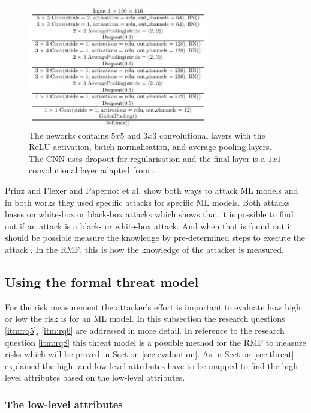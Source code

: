 \begin{figure}[ht!]
  \centering
  \includegraphics[width=8cm]{pictures/cnn_whitebox.jpg}
  \caption{The neworks contains $5x5$ and $3x3$ convolutional layers with the ReLU activation, batch normalisation, and average-pooling layers. The CNN uses dropout for regularisation and the final layer is a $1x1$ convolutional layer adapted from \cite{DBLP:journals/corr/abs-2007-14714}.}
  \label{fig:cnn_whitebox}
\end{figure}

Prinz and Flexer \cite{DBLP:journals/corr/abs-2007-14714} and Papernot et al. \cite{DBLP:conf/ccs/PapernotMGJCS17} show both ways to attack ML models and in both works they used specific attacks for specific ML models. Both attacks bases on white-box or black-box attacks which shows that it is possible to find out if an attack is a black- or white-box attack. And when that is found out it should be possible measure the knowledge by pre-determined steps to execute the attack \cite{bsi_2013}. In the RMF, this is how the knowledge of the attacker is measured.

\subsection{Using the formal threat model}
\label{sec:use_threat_model}

For the risk measurement the attacker's effort is important to evaluate how high or low the risk is for an ML model. In this subsection the research questions \ref{itm:rq5}, \ref{itm:rq6} are addressed in more detail. In reference to the research question \ref{itm:rq8} this threat model is a possible method for the RMF to measure risks which will be proved in Section \ref{sec:evaluation}.
As in Section \ref{sec:threat} explained the high- and low-level attributes have to be mapped to find the high-level attributes based on the low-level attributes.

\subsubsection*{The low-level attributes}

